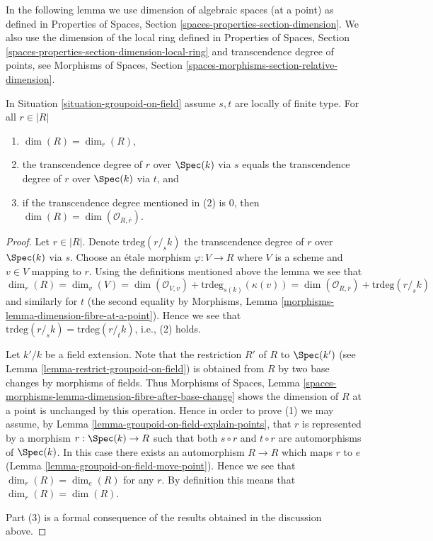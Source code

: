 \noindent
In the following lemma we use dimension of algebraic spaces (at a point)
as defined in
Properties of Spaces, Section \ref{spaces-properties-section-dimension}.
We also use the dimension of the local ring defined in
Properties of Spaces, Section
\ref{spaces-properties-section-dimension-local-ring}
and transcendence degree of points, see
Morphisms of Spaces, Section \ref{spaces-morphisms-section-relative-dimension}.

\begin{lemma}
\label{lemma-groupoid-on-field-locally-finite-type-dimension}
In
Situation \ref{situation-groupoid-on-field}
assume $s, t$ are locally of finite type.
For all $r \in |R|$
\begin{enumerate}
\item $\dim(R) = \dim_r(R)$,
\item the transcendence degree of $r$ over $\Spec(k)$
via $s$ equals the transcendence degree of $r$ over $\Spec(k)$
via $t$, and
\item if the transcendence degree mentioned in (2) is $0$, then
$\dim(R) = \dim(\mathcal{O}_{R, \overline{r}})$.
\end{enumerate}
\end{lemma}

\begin{proof}
Let $r \in |R|$. Denote $\text{trdeg}(r/_{\!\! s}k)$ the transcendence
degree of $r$ over $\Spec(k)$ via $s$. Choose an \'etale morphism
$\varphi : V \to R$ where $V$ is a scheme and $v \in V$ mapping to $r$.
Using the definitions mentioned above the lemma we see that
$$
\dim_r(R) = \dim_v(V) =
\dim(\mathcal{O}_{V, v}) + \text{trdeg}_{s(k)}(\kappa(v)) =
\dim(\mathcal{O}_{R, \overline{r}}) + \text{trdeg}(r/_{\!\! s}k)
$$
and similarly for $t$ (the second equality by
Morphisms, Lemma \ref{morphisms-lemma-dimension-fibre-at-a-point}).
Hence we see that $\text{trdeg}(r/_{\!\! s}k) = \text{trdeg}(r/_{\!\! t}k)$,
i.e., (2) holds.

\medskip\noindent
Let $k'/k$ be a field extension. Note that the restriction $R'$
of $R$ to $\Spec(k')$ (see
Lemma \ref{lemma-restrict-groupoid-on-field})
is obtained from $R$ by two base changes by morphisms of fields. Thus
Morphisms of Spaces,
Lemma \ref{spaces-morphisms-lemma-dimension-fibre-after-base-change}
shows the dimension of $R$ at a point is unchanged by this operation.
Hence in order to prove (1) we may assume, by
Lemma \ref{lemma-groupoid-on-field-explain-points},
that $r$ is represented by a morphism $r : \Spec(k) \to R$ such
that both $s \circ r$ and $t \circ r$ are automorphisms of $\Spec(k)$.
In this case there exists an automorphism $R \to R$ which maps $r$ to $e$
(Lemma \ref{lemma-groupoid-on-field-move-point}).
Hence we see that $\dim_r(R) = \dim_e(R)$ for any $r$. By definition this
means that $\dim_r(R) = \dim(R)$.

\medskip\noindent
Part (3) is a formal consequence of the results obtained in the discussion
above.
\end{proof}

